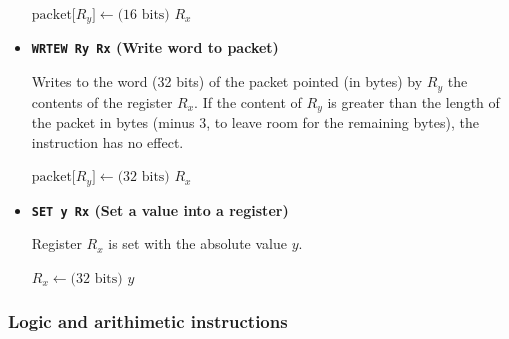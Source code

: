 \documentclass[11pt]{article}
\begin{document}
\begin{itemize}
$\mbox{packet[$R_y$]} \leftarrow \mbox{(16 bits)\ } R_x$


\item \textbf{\texttt{WRTEW Ry  Rx} (Write word to packet)} 


Writes to the word (32 bits) of the packet pointed (in bytes) by $R_y$ the contents of the register $R_x$. If the content of $R_y$ is greater than the length of the packet in bytes (minus 3, to leave room for the remaining bytes), the instruction has no effect.

$\mbox{packet[$R_y$]} \leftarrow \mbox{(32 bits)\ } R_x$

\item \textbf{\texttt{SET y  Rx} (Set a value into a register)} 

Register $R_x$ is set with the absolute value $y$.

$R_x \leftarrow \mbox{(32 bits)\ } y$


\end{itemize}


\subsubsection{Logic and arithimetic instructions}
\end{document}
